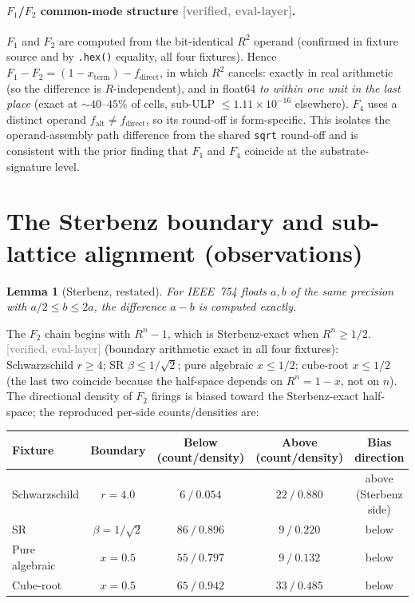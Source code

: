 \documentclass[11pt,a4paper]{article}
\newtheorem{lemma}{Lemma}
\newcommand{\status}[1]{\textcolor{gray}{\small\textsf{[#1]}}}
\begin{document}
\paragraph{$F_1$/$F_2$ common-mode structure \status{verified, eval-layer}.} $F_1$ and $F_2$ are computed from the bit-identical $R^2$ operand (confirmed in fixture source and by \texttt{.hex()} equality, all four fixtures). Hence $F_1-F_2=(1-x_{\mathrm{term}})-f_{\mathrm{direct}}$, in which $R^2$ cancels: exactly in real arithmetic (so the difference is $R$-independent), and in float64 \emph{to within one unit in the last place} (exact at $\sim40$--$45\%$ of cells, sub-ULP $\le1.11\times10^{-16}$ elsewhere). $F_4$ uses a distinct operand $f_{\mathrm{alt}}\ne f_{\mathrm{direct}}$, so its round-off is form-specific. This isolates the operand-assembly path difference from the shared \texttt{sqrt} round-off and is consistent with the prior finding that $F_1$ and $F_4$ coincide at the substrate-signature level.

\section{The Sterbenz boundary and sub-lattice alignment (observations)}\label{sec:sterbenz}

\begin{lemma}[Sterbenz, restated]\label{lem:sterbenz}
For IEEE~754 floats $a,b$ of the same precision with $a/2\le b\le 2a$, the difference $a-b$ is computed exactly.
\end{lemma}

The $F_2$ chain begins with $R^n-1$, which is Sterbenz-exact when $R^n\ge1/2$. \status{verified, eval-layer} (boundary arithmetic exact in all four fixtures):
Schwarzschild $r\ge4$; SR $\beta\le1/\sqrt2$; pure algebraic $x\le1/2$; cube-root $x\le1/2$ (the last two coincide because the half-space depends on $R^n=1-x$, not on $n$). The directional density of $F_2$ firings is biased toward the Sterbenz-exact half-space; the reproduced per-side counts/densities are:

\begin{center}
\begin{tabular}{lcccc}
\toprule
Fixture & Boundary & Below (count/density) & Above (count/density) & Bias direction\\
\midrule
Schwarzschild & $r=4.0$ & $6\ /\ 0.054$ & $22\ /\ 0.880$ & above (Sterbenz side)\\
SR & $\beta=1/\sqrt2$ & $86\ /\ 0.896$ & $9\ /\ 0.220$ & below\\
Pure algebraic & $x=0.5$ & $55\ /\ 0.797$ & $9\ /\ 0.132$ & below\\
Cube-root & $x=0.5$ & $65\ /\ 0.942$ & $33\ /\ 0.485$ & below\\
\bottomrule
\end{tabular}
\end{center}
\end{document}
